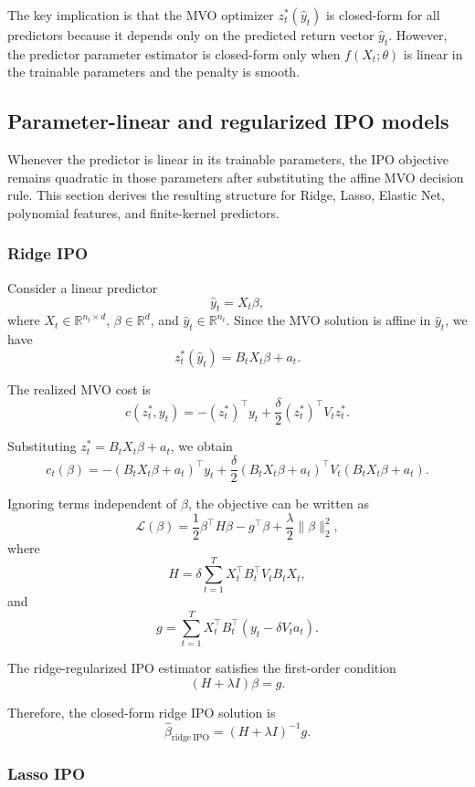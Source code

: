 \documentclass{article}
\begin{document}
The key implication is that the MVO optimizer \(z_t^*(\hat y_t)\) is
closed-form for all predictors because it depends only on the predicted return
vector \(\hat y_t\). However, the predictor parameter estimator is
closed-form only when \(f(X_t;\theta)\) is linear in the trainable parameters
and the penalty is smooth.

\subsection{Parameter-linear and regularized IPO models}

Whenever the predictor is linear in its trainable parameters, the IPO objective
remains quadratic in those parameters after substituting the affine MVO
decision rule. This section derives the resulting structure for Ridge, Lasso,
Elastic Net, polynomial features, and finite-kernel predictors.

\subsubsection{Ridge IPO}

Consider a linear predictor
\[
\hat y_t = X_t \beta,
\]
where \(X_t \in \mathbb R^{n_t \times d}\), \(\beta \in \mathbb R^d\), and
\(\hat y_t \in \mathbb R^{n_t}\). Since the MVO solution is affine in
\(\hat y_t\), we have
\[
z_t^*(\hat y_t)
=
B_t X_t\beta + a_t.
\]

The realized MVO cost is
\[
c(z_t^*, y_t)
=
-(z_t^*)^\top y_t
+
\frac{\delta}{2}(z_t^*)^\top V_t z_t^*.
\]

Substituting \(z_t^* = B_tX_t\beta + a_t\), we obtain
\[
c_t(\beta)
=
-\left(B_tX_t\beta + a_t\right)^\top y_t
+
\frac{\delta}{2}
\left(B_tX_t\beta + a_t\right)^\top
V_t
\left(B_tX_t\beta + a_t\right).
\]

Ignoring terms independent of \(\beta\), the objective can be written as
\[
\mathcal L(\beta)
=
\frac{1}{2}\beta^\top H\beta
-
g^\top \beta
+
\frac{\lambda}{2}\|\beta\|_2^2,
\]
where
\[
H
=
\delta
\sum_{t=1}^T
X_t^\top B_t^\top V_t B_t X_t,
\]
and
\[
g
=
\sum_{t=1}^T
X_t^\top B_t^\top
\left(
y_t - \delta V_t a_t
\right).
\]

The ridge-regularized IPO estimator satisfies the first-order condition
\[
(H+\lambda I)\beta = g.
\]

Therefore, the closed-form ridge IPO solution is
\[
\boxed{
\hat\beta_{\mathrm{ridge\ IPO}}
=
(H+\lambda I)^{-1}g.
}
\]

\subsubsection{Lasso IPO}
\end{document}
